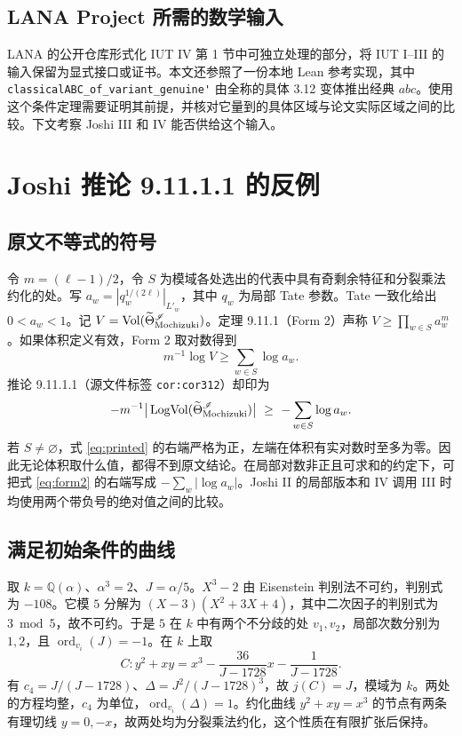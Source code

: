 \documentclass[UTF8,fontset=none,zihao=-4,a4paper]{ctexart}
\newcommand{\Q}{\mathbb Q}
\newcommand{\Vol}{\operatorname{Vol}}
\newcommand{\LogVol}{\operatorname{LogVol}}
\newcommand{\ord}{\operatorname{ord}}
\begin{document}
\subsection{LANA Project 所需的数学输入}
LANA 的公开仓库形式化 IUT IV 第 1 节中可独立处理的部分，将 IUT I--III 的输入保留为显式接口或证书。本文还参照了一份本地 Lean 参考实现，其中 \nolinkurl{classicalABC_of_variant_genuine'} 由全称的具体 3.12 变体推出经典 \(abc\)。使用这个条件定理需要证明其前提，并核对它量到的具体区域与论文实际区域之间的比较。下文考察 Joshi III 和 IV 能否供给这个输入。\cite{lana,localref,jiii,jiv}

\section{Joshi 推论 9.11.1.1 的反例}
\subsection{原文不等式的符号}
令 \(m=(\ell-1)/2\)，令 \(S\) 为模域各处选出的代表中具有奇剩余特征和分裂乘法约化的处。写 \(a_w=|q_w^{1/(2\ell)}|_{L'_w}\)，其中 \(q_w\) 为局部 Tate 参数。Tate 一致化给出 \(0<a_w<1\)。记 \(V=\Vol(\widetilde\Theta_{\rm Mochizuki}^{\mathscr I})\)。定理 9.11.1（Form 2）声称 \(V\ge\prod_{w\in S}a_w^m\)。如果体积定义有效，Form 2 取对数得到
\begin{equation}
 m^{-1}\log V\ge \sum_{w\in S}\log a_w. \label{eq:form2}
\end{equation}
推论 9.11.1.1（源文件标签 \texttt{cor:cor312}）却印为
\begin{equation}
 -m^{-1}\big|\LogVol(\widetilde\Theta_{\rm Mochizuki}^{\mathscr I})\big|
 \ \ge\ -\sum_{w\in S}\log a_w. \label{eq:printed}
\end{equation}
若 \(S\ne\varnothing\)，式 \eqref{eq:printed} 的右端严格为正，左端在体积有实对数时至多为零。因此无论体积取什么值，都得不到原文结论。在局部对数非正且可求和的约定下，可把式 \eqref{eq:form2} 的右端写成 \(-\sum_w|\log a_w|\)。Joshi II 的局部版本和 IV 调用 III 时均使用两个带负号的绝对值之间的比较。\cite[定理 9.11.1 至推论 9.11.1.1]{jiii}\cite{jii,jiv}

\subsection{满足初始条件的曲线}
取 \(k=\Q(\alpha)\)、\(\alpha^3=2\)、\(J=\alpha/5\)。\(X^3-2\) 由 Eisenstein 判别法不可约，判别式为 \(-108\)。它模 \(5\) 分解为 \((X-3)(X^2+3X+4)\)，其中二次因子的判别式为 \(3\bmod 5\)，故不可约。于是 \(5\) 在 \(k\) 中有两个不分歧的处 \(v_1,v_2\)，局部次数分别为 \(1,2\)，且 \(\ord_{v_i}(J)=-1\)。在 \(k\) 上取
\[
 C\colon y^2+xy=x^3-\frac{36}{J-1728}x-\frac1{J-1728}.
\]
有 \(c_4=J/(J-1728)\)、\(\Delta=J^2/(J-1728)^3\)，故 \(j(C)=J\)，模域为 \(k\)。两处的方程均整，\(c_4\) 为单位，\(\ord_{v_i}(\Delta)=1\)。约化曲线 \(y^2+xy=x^3\) 的节点有两条有理切线 \(y=0,-x\)，故两处均为分裂乘法约化，这个性质在有限扩张后保持。
\end{document}

